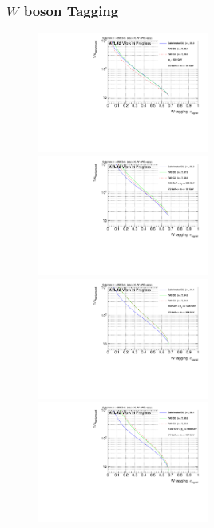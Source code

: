 \subsubsection{$W$ boson Tagging}
\begin{figure}[H]
\includegraphics[width=0.5\textwidth]{sascha_input/Appendix/W_best/ROC_ALL_h_recoJet_D2_bin1.pdf} \hspace{1mm}
\includegraphics[width=0.5\textwidth]{sascha_input/Appendix/W_best/ROC_ALL_h_recoJet_D2_bin2.pdf}
\bigskip
\includegraphics[width=0.5\textwidth]{sascha_input/Appendix/W_best/ROC_ALL_h_recoJet_D2_bin3.pdf} \hspace{1mm}
\includegraphics[width=0.5\textwidth]{sascha_input/Appendix/W_best/ROC_ALL_h_recoJet_D2_bin4.pdf}

\end{figure}

